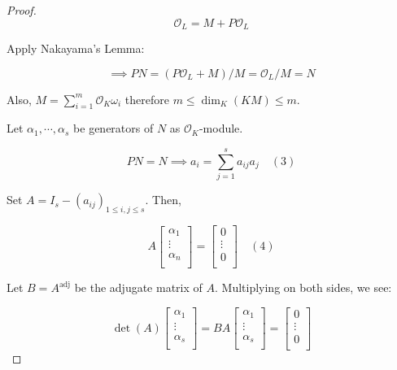 \documentclass[openany]{amsbook}
\numberwithin{section}{chapter}
\theoremstyle{definition}
\begin{document}
\begin{proof}
    \[
        \mathcal{O}_L = M + P \mathcal{O}_L
    \]
    
    Apply Nakayama's Lemma:

    \[
        \implies PN = (P \mathcal{O}_L + M) / M = \mathcal{O}_L / M = N
    \]

    Also, \(M = \sum_{i=1}^m \mathcal{O}_K \omega_i\) therefore \(m \leq \dim_K(KM) \leq m\).

    Let \(\alpha_1, \cdots , \alpha_s\) be generators of \(N\) as \(\mathcal{O}_K\)-module. 

    \[
        PN = N \implies a_i = \sum_{j=1}^s a_{ij} a_j \quad(3)
    \]

    Set \(A = I_s - (a_{ij})_{1\leq i,j\leq s}\). Then,
    
    \[
        A \begin{bmatrix}
             \alpha_1 \\
             \vdots \\
             \alpha_n \\
        \end{bmatrix} = \begin{bmatrix}
             0 \\
             \vdots \\
             0 \\
        \end{bmatrix} \quad (4)
    \]

    Let \(B=A^{\operatorname{adj}}\) be the adjugate matrix of \(A\). Multiplying on both sides, we see: 

    \[
        \det (A) \begin{bmatrix}
             \alpha_1 \\
             \vdots \\
             \alpha_s \\
        \end{bmatrix} = BA \begin{bmatrix}
             \alpha_1 \\
             \vdots \\
             \alpha_s \\
        \end{bmatrix} = \begin{bmatrix}
             0 \\
             \vdots \\
             0 \\
        \end{bmatrix}
    \]


\end{proof}
\end{document}
